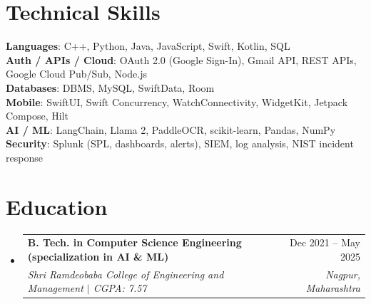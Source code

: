 \documentclass[a4paper,11pt]{article}
\makeatletter
\newcommand{\resumeSubheading}[4]{
  \vspace{-1pt}\item
    \begin{tabularx}{0.97\textwidth}[t]{@{}>{\raggedright\arraybackslash}X@{\hspace{0.75em}}r@{}}
      \textbf{#1} & #2 \\
      \textit{\small#3} & \textit{\small #4} \\
    \end{tabularx}\vspace{-3pt}
}
\newcommand{\resumeSubItemListStart}{\begin{itemize}[leftmargin=0.15in, label={}]}
\newcommand{\resumeSubItemListEnd}{\end{itemize}}
\makeatother
\begin{document}
\section{Technical Skills}
  \begin{itemize}[leftmargin=0.15in, label={}]
    \small{\item{
      \textbf{Languages}{: C++, Python, Java, JavaScript, Swift, Kotlin, SQL} \\
      \textbf{Auth / APIs / Cloud}{: OAuth 2.0 (Google Sign-In), Gmail API, REST APIs, Google Cloud Pub/Sub, Node.js} \\
      \textbf{Databases}{: DBMS, MySQL, SwiftData, Room} \\
      \textbf{Mobile}{: SwiftUI, Swift Concurrency, WatchConnectivity, WidgetKit, Jetpack Compose, Hilt} \\
      \textbf{AI / ML}{: LangChain, Llama 2, PaddleOCR, scikit-learn, Pandas, NumPy} \\
      \textbf{Security}{: Splunk (SPL, dashboards, alerts), SIEM, log analysis, NIST incident response}
    }}
  \end{itemize}

\section{Education}
  \resumeSubItemListStart
    \resumeSubheading
      {B. Tech. in Computer Science Engineering (specialization in AI \& ML)}{Dec 2021 -- May 2025}
      {Shri Ramdeobaba College of Engineering and Management $|$ CGPA: 7.57}{Nagpur, Maharashtra}
  \resumeSubItemListEnd
\end{document}
